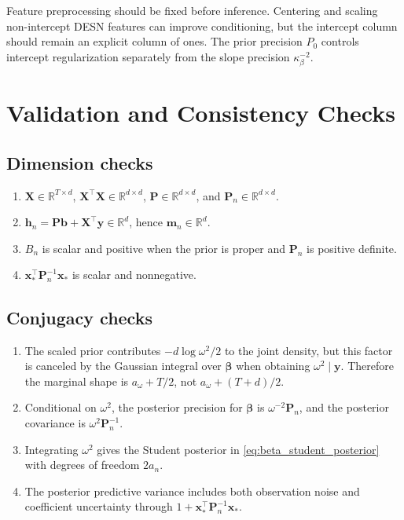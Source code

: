 \documentclass[11pt]{article}
\newcommand{\R}{\mathbb{R}}
\newcommand{\vect}[1]{\bm{#1}}
\newcommand{\mat}[1]{\bm{#1}}
\begin{document}
Feature preprocessing should be fixed before inference. Centering and scaling
non-intercept DESN features can improve conditioning, but the intercept column
should remain an explicit column of ones. The prior precision \(P_0\) controls
intercept regularization separately from the slope precision
\(\kappa_\beta^{-2}\).

\section{Validation and Consistency Checks}
\label{sec:validation}

\subsection{Dimension checks}

\begin{enumerate}[label=(\alph*)]
\item \(\mat X\in\R^{T\times d}\), \(\mat X^\top\mat X\in\R^{d\times d}\),
\(\mat P\in\R^{d\times d}\), and \(\mat P_n\in\R^{d\times d}\).
\item \(\vect h_n=\mat P\vect b+\mat X^\top\vect y\in\R^d\), hence
\(\vect m_n\in\R^d\).
\item \(B_n\) is scalar and positive when the prior is proper and
\(\mat P_n\) is positive definite.
\item \(\vect x_*^\top\mat P_n^{-1}\vect x_*\) is scalar and nonnegative.
\end{enumerate}

\subsection{Conjugacy checks}

\begin{enumerate}[label=(\alph*)]
\item The scaled prior contributes \(-d\log\omega^2/2\) to the joint density,
but this factor is canceled by the Gaussian integral over \(\vect\beta\) when
obtaining \(\omega^2\mid\vect y\). Therefore the marginal shape is
\(a_\omega+T/2\), not \(a_\omega+(T+d)/2\).
\item Conditional on \(\omega^2\), the posterior precision for \(\vect\beta\) is
\(\omega^{-2}\mat P_n\), and the posterior covariance is
\(\omega^2\mat P_n^{-1}\).
\item Integrating \(\omega^2\) gives the Student posterior in
\eqref{eq:beta_student_posterior} with degrees of freedom \(2a_n\).
\item The posterior predictive variance includes both observation noise and
coefficient uncertainty through
\(1+\vect x_*^\top\mat P_n^{-1}\vect x_*\).
\end{enumerate}
\end{document}
